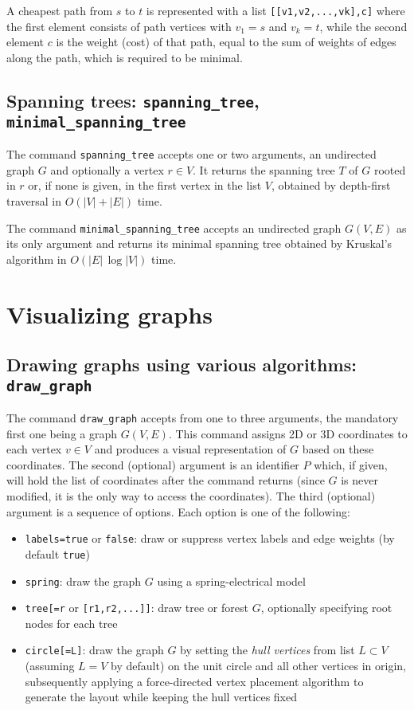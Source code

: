 \documentclass[a4paper,11pt]{article}
\begin{document}
A cheapest path from $ s $ to $ t $ is represented with a list {\tt [[v1,v2,...,vk],c]} where the first element consists of path vertices with $ v_1=s $ and $ v_k=t $, while the second element $ c $ is the weight (cost) of that path, equal to the sum of weights of edges along the path, which is required to be minimal.

\subsection{Spanning trees: {\tt spanning\_tree}, {\tt minimal\_spanning\_tree}}

The command {\tt spanning\_tree} accepts one or two arguments, an undirected graph $ G $ and optionally a vertex $ r\in V $. It returns the spanning tree $ T $ of $ G $ rooted in $ r $ or, if none is given, in the first vertex in the list $ V $, obtained by depth-first traversal in $ O(|V|+|E|) $ time.

The command {\tt minimal\_spanning\_tree} accepts an undirected graph $ G(V,E) $ as its only argument and returns its minimal spanning tree obtained by Kruskal's algorithm in $ O(|E|\,\log|V|) $ time.

\section{Visualizing graphs}

\subsection{Drawing graphs using various algorithms: {\tt draw\_graph}}

The command {\tt draw\_graph} accepts from one to three arguments, the mandatory first one being a graph $ G(V,E) $. This command assigns 2D or 3D coordinates to each vertex $ v\in V $ and produces a visual representation of $ G $ based on these coordinates. The second (optional) argument is an identifier $ P $ which, if given, will hold the list of coordinates after the command returns (since $ G $ is never modified, it is the only way to access the coordinates). The third (optional) argument is a sequence of options. Each option is one of the following:
\begin{itemize}
  \item {\tt labels=true} or {\tt false}: draw or suppress vertex labels and edge weights (by default {\tt true})
  \item {\tt spring}: draw the graph $ G $ using a spring-electrical model
  \item {\tt tree[=r} or {\tt [r1,r2,...]]}: draw tree or forest $ G $, optionally specifying root nodes for each tree
  \item {\tt circle[=L]}: draw the graph $ G $ by setting the {\it hull vertices} from list $ L\subset V $ (assuming $ L=V $ by default) on the unit circle and all other vertices in origin, subsequently applying a force-directed vertex placement algorithm to generate the layout while keeping the hull vertices fixed
\end{itemize}
\end{document}
